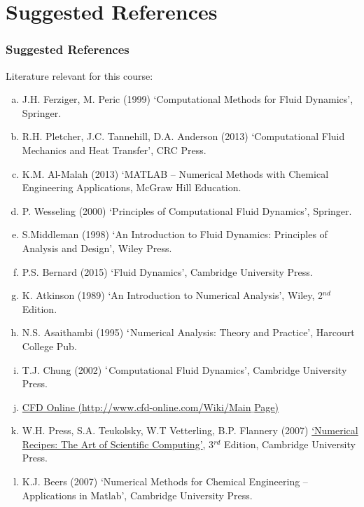 \documentclass[10pt,compress,handout,ignorenonframetext]{beamer}
\begin{document}
\section{Suggested References}


\begin{frame}
 \frametitle{Suggested References}
  Literature relevant for this course:
  \begin{enumerate}[(a)]\scriptsize
   \item J.H. Ferziger, M. Peric (1999) `Computational Methods for Fluid Dynamics', Springer.
   \item R.H. Pletcher, J.C. Tannehill, D.A. Anderson (2013) `Computational Fluid Mechanics and Heat Transfer', CRC Press.
   \item K.M. Al-Malah (2013) `MATLAB -- Numerical Methods with Chemical Engineering Applications, McGraw Hill Education.
   \item P. Wesseling (2000) `Principles of Computational Fluid Dynamics', Springer.
   \item S.Middleman (1998) `An Introduction to Fluid Dynamics: Principles of Analysis and Design', Wiley Press.
   \item P.S. Bernard (2015) `Fluid Dynamics', Cambridge University Press.
   \item K. Atkinson (1989) `An Introduction to Numerical Analysis', Wiley, 2$^{nd}$ Edition.
   \item N.S. Asaithambi (1995) $\lq$Numerical Analysis: Theory and Practice', Harcourt College Pub.
   \item T.J. Chung (2002) $\lq$Computational Fluid Dynamics', Cambridge University Press.
   \item \href{http://www.cfd-online.com/Wiki/Main_Page}{CFD Online (http://www.cfd-online.com/Wiki/Main$\_$Page)}
   \item W.H. Press, S.A. Teukolsky, W.T Vetterling, B.P. Flannery (2007) \href{http://www.nr.com/oldverswitcher.html}{`Numerical Recipes: The Art of Scientific Computing'}, 3$^{rd}$ Edition, Cambridge University Press.
   \item K.J. Beers (2007) `Numerical Methods for Chemical Engineering -- Applications in Matlab', Cambridge University Press.
  \end{enumerate}
\end{frame}
\end{document}
